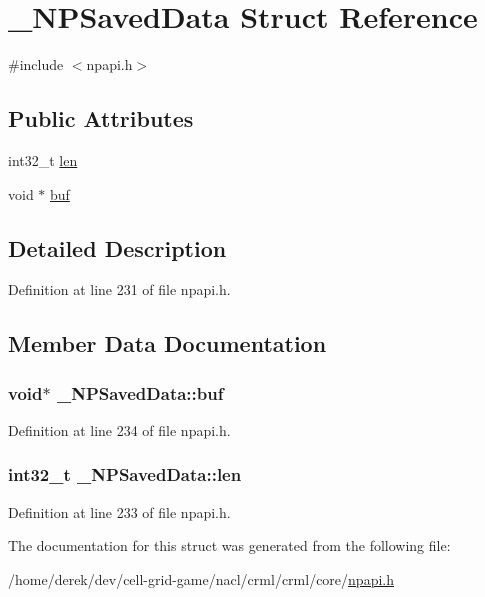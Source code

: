 \hypertarget{struct___n_p_saved_data}{
\section{\_\-NPSavedData Struct Reference}
\label{struct___n_p_saved_data}
}


{\ttfamily \#include $<$npapi.h$>$}

\subsection*{Public Attributes}
\begin{DoxyCompactItemize}
\item 
int32\_\-t \hyperlink{struct___n_p_saved_data_aa23b15e0b958019ac7dc5bce5a96db6b}{len}
\item 
void $\ast$ \hyperlink{struct___n_p_saved_data_acbee6e01aa8846a70ba05709b78fa6bc}{buf}
\end{DoxyCompactItemize}


\subsection{Detailed Description}


Definition at line 231 of file npapi.h.



\subsection{Member Data Documentation}
\hypertarget{struct___n_p_saved_data_acbee6e01aa8846a70ba05709b78fa6bc}{
\subsubsection[{buf}]{\setlength{\rightskip}{0pt plus 5cm}void$\ast$ {\bf \_\-NPSavedData::buf}}}
\label{struct___n_p_saved_data_acbee6e01aa8846a70ba05709b78fa6bc}


Definition at line 234 of file npapi.h.

\hypertarget{struct___n_p_saved_data_aa23b15e0b958019ac7dc5bce5a96db6b}{
\subsubsection[{len}]{\setlength{\rightskip}{0pt plus 5cm}int32\_\-t {\bf \_\-NPSavedData::len}}}
\label{struct___n_p_saved_data_aa23b15e0b958019ac7dc5bce5a96db6b}


Definition at line 233 of file npapi.h.



The documentation for this struct was generated from the following file:\begin{DoxyCompactItemize}
\item 
/home/derek/dev/cell-\/grid-\/game/nacl/crml/crml/core/\hyperlink{npapi_8h}{npapi.h}\end{DoxyCompactItemize}
